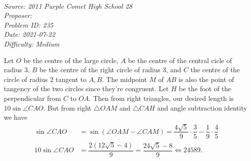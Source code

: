 \SSbreak\\
\emph{Source: 2011 Purple Comet High School 28}\\
\emph{Proposer: \Paiya}\\ %
\emph{Problem ID: 235}\\
\emph{Date: 2021-07-22}\\
\emph{Difficulty: Medium}\\
\SSbreak

\bigskip

\begin{solution}\hfil\medskip
  
    Let $O$ be the centre of the large circle, $A$ be the centre of the central cicle of radius 3, 
    $B$ be the centre of the right circle of radius 3, and $C$ the centre of the circle of radius 2 
    tangent to $A, B$. The midpoint $M$ of $\overline{AB}$ is also the point of tangency 
    of the two circles since they're congruent. Let $H$ be the foot of the perpendicular from $C$ to 
    $\overline{OA}$. Then from right triangles, our desired length is $10 \sin \angle CAO$. 
    But from right $\triangle OAM$ and $\triangle CAH$ and angle subtraction identity we have 
    \begin{align*}
        \sin \angle CAO &= \sin \left(\angle OAM - \angle CAM\right) = \dfrac{4\sqrt{5}}{9} \cdot \dfrac{3}{5} - \dfrac{1}{9} \cdot \dfrac{4}{5} \\
        10 \sin \angle CAO &= \dfrac{2\left(12\sqrt{5} - 4\right)}{9} = \dfrac{24\sqrt{5} - 8}{9} \iff \boxed{24589}.
    \end{align*}
\end{solution}\bigskip
